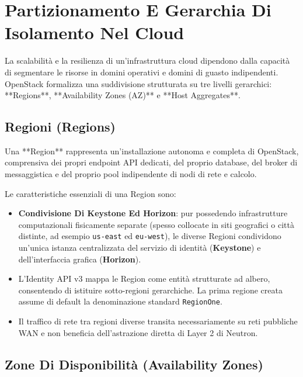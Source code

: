 \documentclass[11pt, a4paper]{article}
\begin{document}
\section{Partizionamento E Gerarchia Di Isolamento Nel Cloud}

La scalabilità e la resilienza di un'infrastruttura cloud dipendono dalla capacità di segmentare le risorse in domini operativi e domini di guasto indipendenti. OpenStack formalizza una suddivisione strutturata su tre livelli gerarchici: **Regions**, **Availability Zones (AZ)** e **Host Aggregates**.


\subsection{Regioni (Regions)}

Una **Region** rappresenta un'installazione autonoma e completa di OpenStack, comprensiva dei propri endpoint API dedicati, del proprio database, del broker di messaggistica e del proprio pool indipendente di nodi di rete e calcolo.

Le caratteristiche essenziali di una Region sono:
\begin{itemize}
    \item \textbf{Condivisione Di Keystone Ed Horizon}: pur possedendo infrastrutture computazionali fisicamente separate (spesso collocate in siti geografici o città distinte, ad esempio \texttt{us-east} ed \texttt{eu-west}), le diverse Regioni condividono un'unica istanza centralizzata del servizio di identità (\textbf{Keystone}) e dell'interfaccia grafica (\textbf{Horizon}).
    \item L'Identity API v3 mappa le Region come entità strutturate ad albero, consentendo di istituire sotto-regioni gerarchiche. La prima regione creata assume di default la denominazione standard \texttt{RegionOne}.
    \item Il traffico di rete tra regioni diverse transita necessariamente su reti pubbliche WAN e non beneficia dell'astrazione diretta di Layer 2 di Neutron.
\end{itemize}

\subsection{Zone Di Disponibilità (Availability Zones)}
\end{document}
